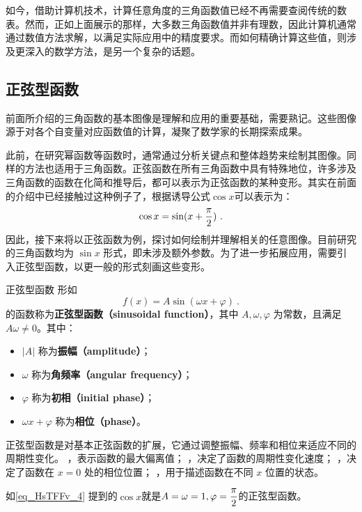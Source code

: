 如今，借助计算机技术，计算任意角度的三角函数值已经不再需要查阅传统的数表。然而，正如上面展示的那样，大多数三角函数值并非有理数，因此计算机通常通过数值方法求解，以满足实际应用中的精度要求。而如何精确计算这些值，则涉及更深入的数学方法，是另一个复杂的话题。

\subsection{正弦型函数}

前面所介绍的三角函数的基本图像是理解和应用的重要基础，需要熟记。这些图像源于对各个自变量对应函数值的计算，凝聚了数学家的长期探索成果。

此前，在研究幂函数等函数时，通常通过分析关键点和整体趋势来绘制其图像。同样的方法也适用于三角函数。正弦函数在所有三角函数中具有特殊地位，许多涉及三角函数的函数在化简和推导后，都可以表示为正弦函数的某种变形。其实在前面的介绍中已经接触过这种例子了，根据诱导公式$\cos x$可以表示为：
\begin{equation}\label{eq_HsTFFv_4}
\cos x=\sin(x+{\pi\over2})~.
\end{equation}
因此，接下来将以正弦函数为例，探讨如何绘制并理解相关的任意图像。目前研究的三角函数均为 $\sin x$ 形式，即未涉及额外参数。为了进一步拓展应用，需要引入正弦型函数，以更一般的形式刻画这些变形。

\begin{definition}{正弦型函数}
形如
\begin{equation}
f(x) = A\sin(\omega x + \varphi)~.
\end{equation}
的函数称为\textbf{正弦型函数（sinusoidal function）}，其中 $A, \omega, \varphi$ 为常数，且满足 $A\omega \neq 0$。其中：
\begin{itemize}
\item $|A|$ 称为\textbf{振幅（amplitude）}；
\item $\omega$ 称为\textbf{角频率（angular frequency）}；
\item $\varphi$ 称为\textbf{初相（initial phase）}；
\item $\omega x + \varphi$ 称为\textbf{相位（phase）}。
\end{itemize}
\end{definition}
正弦型函数是对基本正弦函数的扩展，它通过调整振幅、频率和相位来适应不同的周期性变化。
，表示函数的最大偏离值；
，决定了函数的周期性变化速度；
，决定了函数在 $x=0$ 处的相位位置；
，用于描述函数在不同 $x$ 位置的状态。



如\autoref{eq_HsTFFv_4} 提到的$\cos x$就是$\displaystyle A=\omega=1,\varphi={\pi\over2}$的正弦型函数。

